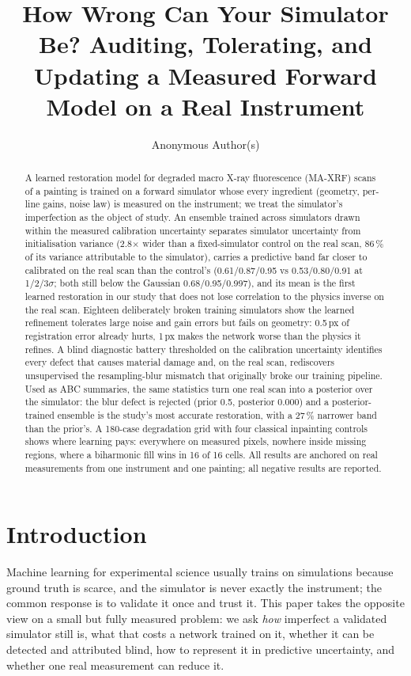 \documentclass{article}
\title{How Wrong Can Your Simulator Be? Auditing, Tolerating, and Updating a Measured Forward Model on a Real Instrument}
\author{%
  Anonymous Author(s)
}
\begin{document}
\maketitle

\begin{abstract}
A learned restoration model for degraded macro X-ray fluorescence (MA-XRF) scans of a painting is trained on a forward simulator whose every ingredient (geometry, per-line gains, noise law) is measured on the instrument; we treat the simulator's imperfection as the object of study. An ensemble trained across simulators drawn within the measured calibration uncertainty separates simulator uncertainty from initialisation variance (2.8$\times$ wider than a fixed-simulator control on the real scan, 86\,\% of its variance attributable to the simulator), carries a predictive band far closer to calibrated on the real scan than the control's (0.61/0.87/0.95 vs 0.53/0.80/0.91 at 1/2/3$\sigma$; both still below the Gaussian 0.68/0.95/0.997), and its mean is the first learned restoration in our study that does not lose correlation to the physics inverse on the real scan. Eighteen deliberately broken training simulators show the learned refinement tolerates large noise and gain errors but fails on geometry: 0.5\,px of registration error already hurts, 1\,px makes the network worse than the physics it refines. A blind diagnostic battery thresholded on the calibration uncertainty identifies every defect that causes material damage and, on the real scan, rediscovers unsupervised the resampling-blur mismatch that originally broke our training pipeline. Used as ABC summaries, the same statistics turn one real scan into a posterior over the simulator: the blur defect is rejected (prior 0.5, posterior 0.000) and a posterior-trained ensemble is the study's most accurate restoration, with a 27\,\% narrower band than the prior's. A 180-case degradation grid with four classical inpainting controls shows where learning pays: everywhere on measured pixels, nowhere inside missing regions, where a biharmonic fill wins in 16 of 16 cells. All results are anchored on real measurements from one instrument and one painting; all negative results are reported.
\end{abstract}

\section{Introduction}
\label{sec:intro}

Machine learning for experimental science usually trains on simulations because ground truth is scarce, and the simulator is never exactly the instrument; the common response is to validate it once and trust it. This paper takes the opposite view on a small but fully measured problem: we ask \emph{how} imperfect a validated simulator still is, what that costs a network trained on it, whether it can be detected and attributed blind, how to represent it in predictive uncertainty, and whether one real measurement can reduce it.
\end{document}
